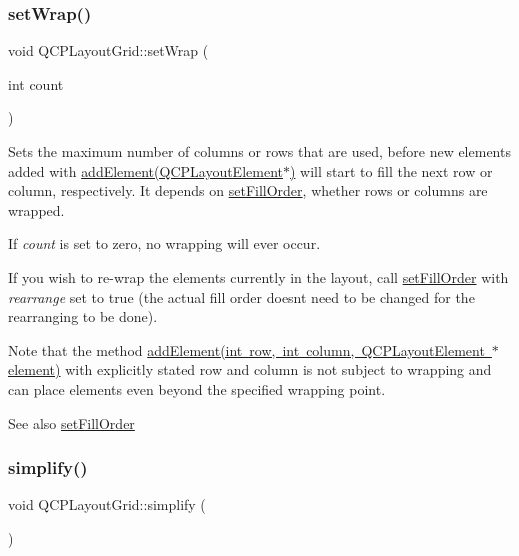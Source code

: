 \subsubsection{\texorpdfstring{setWrap()}{setWrap()}}
{\footnotesize\ttfamily void Q\+C\+P\+Layout\+Grid\+::set\+Wrap (\begin{DoxyParamCaption}\item[{int}]{count }\end{DoxyParamCaption})}

Sets the maximum number of columns or rows that are used, before new elements added with \mbox{\hyperlink{class_q_c_p_layout_grid_a4c44025dd25acd27e053cadfd448ad7b}{add\+Element(\+Q\+C\+P\+Layout\+Element$\ast$)}} will start to fill the next row or column, respectively. It depends on \mbox{\hyperlink{class_q_c_p_layout_grid_affc2f3cfd22f28698c5b29b960d2a391}{set\+Fill\+Order}}, whether rows or columns are wrapped.

If {\itshape count} is set to zero, no wrapping will ever occur.

If you wish to re-\/wrap the elements currently in the layout, call \mbox{\hyperlink{class_q_c_p_layout_grid_affc2f3cfd22f28698c5b29b960d2a391}{set\+Fill\+Order}} with {\itshape rearrange} set to true (the actual fill order doesn\textquotesingle{}t need to be changed for the rearranging to be done).

Note that the method \mbox{\hyperlink{class_q_c_p_layout_grid_adff1a2ca691ed83d2d24a4cd1fe17012}{add\+Element(int row, int column, Q\+C\+P\+Layout\+Element $\ast$element)}} with explicitly stated row and column is not subject to wrapping and can place elements even beyond the specified wrapping point.

\begin{DoxySeeAlso}{See also}
\mbox{\hyperlink{class_q_c_p_layout_grid_affc2f3cfd22f28698c5b29b960d2a391}{set\+Fill\+Order}} 
\end{DoxySeeAlso}
\mbox{\label{class_q_c_p_layout_grid_a38621ca7aa633b6a9a88617df7f08672}} 
\subsubsection{\texorpdfstring{simplify()}{simplify()}}
{\footnotesize\ttfamily void Q\+C\+P\+Layout\+Grid\+::simplify (\begin{DoxyParamCaption}{ }\end{DoxyParamCaption})\hspace{0.3cm}{\ttfamily [virtual]}}

